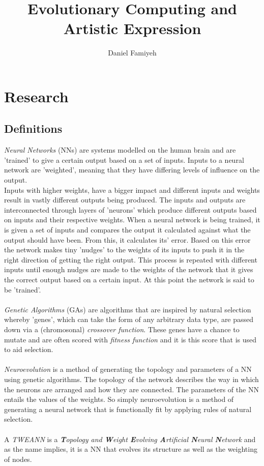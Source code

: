 \documentclass{article}
\title{Evolutionary Computing and Artistic Expression}
\author{Daniel Famiyeh}
\date{}
\begin{document}
\maketitle
\newpage
{}
\begin{center}

\end{center}
\newpage
\section*{Research}
\subsection*{Definitions}
\emph{Neural Networks} (NNs) are systems modelled on the human brain and are 'trained' to give a certain output based on a set of inputs. Inputs to a neural network are 'weighted', meaning that they have differing levels of influence on the output.\\
Inputs with higher weights, have a bigger impact and different inputs and weights result in vastly different outputs being produced.
The inputs and outputs are interconnected through layers of 'neurons' which produce different outputs based on inputs and their respective weights.
When a neural network is being trained, it is given a set of inputs and compares the output it calculated against what the output should have been.
From this, it calculates its' error.
Based on this error the network makes tiny 'nudges' to the weights of its inputs to push it in the right direction of getting the right output.
This process is repeated with different inputs until enough nudges are made to the weights of the network that it gives the correct output based on a certain input. At this point the network is said to be 'trained'.\\\\
\emph{Genetic Algorithms} (GAs) are algorithms that are inspired by natural selection whereby 'genes', which can take the form of any arbitrary data type, are passed down via a (chromosonal) \emph{crossover function}. These genes have a chance to mutate and are often scored with \emph{fitness function} and it is this score that is used to aid selection.\\\\
\emph{Neuroevolution} is a method of generating the topology and parameters of a NN using genetic algorithms.
The topology of the network describes the way in which the neurons are arranged and how they are connected.
The parameters of the NN entails the values of the weights. So simply neuroevolution is a method of generating a neural network that is functionally fit by applying rules of natural selection.\\\\
A \emph{TWEANN} is a \emph{\textbf{T}opology and \textbf{W}eight \textbf{E}volving \textbf{A}rtificial \textbf{N}eural \textbf{N}etwork} and as the name implies, it is a NN that evolves its structure as well as the weighting of nodes.
\newpage
\end{document}
